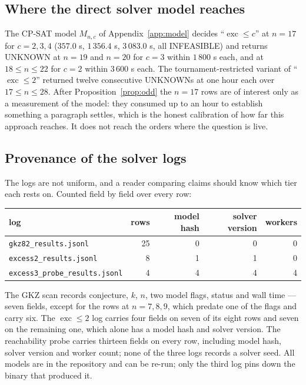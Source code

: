 \documentclass[11pt]{amsart}
\theoremstyle{remark}
\newcommand{\exc}{\operatorname{exc}}
\begin{document}
\subsection{Where the direct solver model reaches}\label{sec:reach}

The CP-SAT model $M_{n,c}$ of Appendix~\ref{app:model} decides
``$\exc \le c$'' at $n = 17$ for $c = 2, 3, 4$ ($357.0$ s, $1\,356.4$ s,
$3\,083.0$ s, all INFEASIBLE) and returns UNKNOWN at $n = 19$ and $n = 20$
for $c = 3$ within $1\,800$ s each, and at $18 \le n \le 22$ for $c = 2$
within $3\,600$ s each. The tournament-restricted variant of
``$\exc \le 2$'' returned twelve consecutive UNKNOWNs at one hour each over
$17 \le n \le 28$. After Proposition~\ref{prop:odd} the $n = 17$ rows are of
interest only as a measurement of the model: they consumed up to an hour to
establish something a paragraph settles, which is the honest calibration of
how far this approach reaches. It does not reach the orders where the
question is live.

\subsection{Provenance of the solver logs}\label{sec:provenance}

The logs are not uniform, and a reader comparing claims should know which tier
each rests on. Counted field by field over every row:

\begin{center}\small
\begin{tabular}{lrrrr}
log & rows & model hash & solver version & workers \\ \hline
\texttt{gkz82\_results.jsonl} & 25 & 0 & 0 & 0 \\
\texttt{excess2\_results.jsonl} & 8 & 1 & 1 & 0 \\
\texttt{excess3\_probe\_results.jsonl} & 4 & 4 & 4 & 4 \\
\end{tabular}
\end{center}

\noindent The GKZ scan records conjecture, $k$, $n$, two model flags, status
and wall time --- seven fields, except for the rows at $n = 7, 8, 9$, which
predate one of the flags and carry six. The $\exc \le 2$ log carries four
fields on seven of its eight rows and seven on the remaining one, which alone
has a model hash and solver version. The reachability probe carries thirteen
fields on every row, including model hash, solver version and worker count;
none of the three logs records a solver seed. All models are in the repository
and can be re-run; only the third log pins down the binary that produced it.
\end{document}
